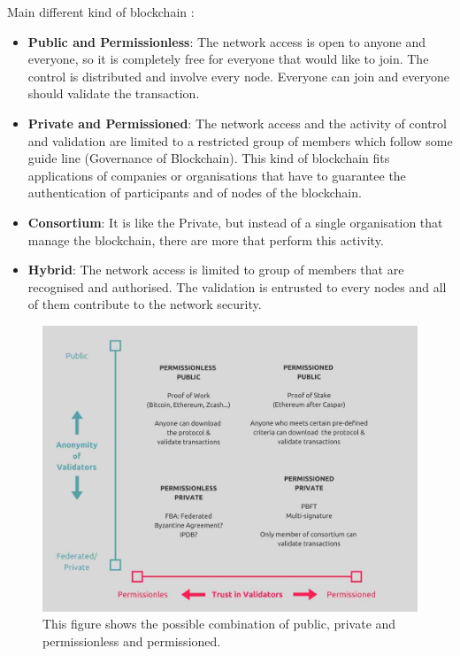 \documentclass{article}
\begin{document}
    \newpage
    Main different kind of blockchain \cite{wiki-Blockchain, BlockchainPP}:
    \begin{itemize}
        \item \textbf{Public and Permissionless}: The network access is open to anyone and everyone, so it is completely free for everyone that would like to join. The control is distributed and involve every node. Everyone can join and everyone should validate the transaction.
        
        \item \textbf{Private and Permissioned}: The network access and the activity of control and validation are limited to a restricted group of members which follow some guide line (Governance of Blockchain). This kind of blockchain fits applications of companies or organisations that have to guarantee the authentication of participants and of nodes of the blockchain.
        
        
        \item \textbf{Consortium}: It is like the Private, but instead of a single organisation that manage the blockchain, there are more that perform this activity.
        
        \item \textbf{Hybrid}: The network access is limited to group of members that are recognised and authorised. The validation is entrusted to every nodes and all of them contribute to the network security.
    \end{itemize}
    \begin{figure}[h]
        \centering
        \includegraphics[width=0.8\linewidth]{pppp.jpg}
        \caption{This figure shows the possible combination of public, private and permissionless and permissioned. \cite{fig-pppp}}
        \label{fig:pppp}
    \end{figure}
    
\end{document}
